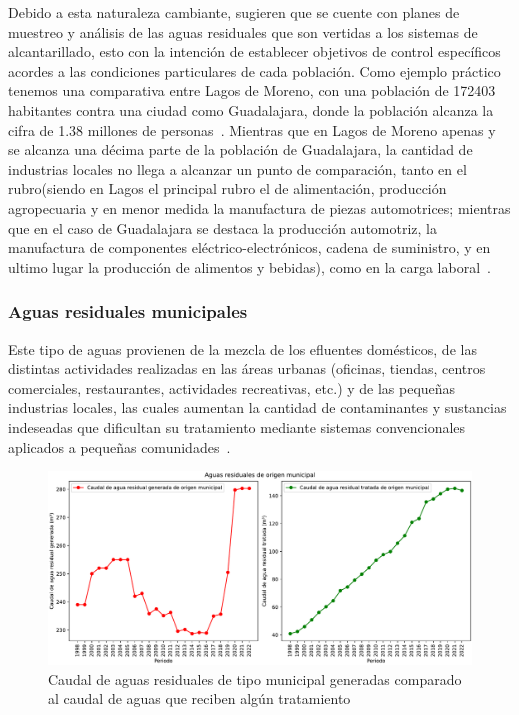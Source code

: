 Debido a esta naturaleza cambiante, \cite{Fair2008} sugieren que se cuente con planes de muestreo y análisis de las aguas residuales que son vertidas a los sistemas de alcantarillado, esto con la intención de establecer objetivos de control específicos acordes a las condiciones particulares de cada población. Como ejemplo práctico tenemos una comparativa entre Lagos de Moreno, con una población de 172403 habitantes contra una ciudad como Guadalajara, donde la población alcanza la cifra de 1.38 millones de personas~\citep{INEGIJAL}. Mientras que en Lagos de Moreno apenas y se alcanza una décima parte de la población de Guadalajara, la cantidad de industrias locales no llega a alcanzar un punto de comparación, tanto en el rubro(siendo en Lagos el principal rubro el de alimentación, producción agropecuaria y en menor medida la manufactura de piezas automotrices; mientras que en el caso de Guadalajara se destaca la producción automotriz, la manufactura de componentes eléctrico-electrónicos, cadena de suministro, y en ultimo lugar la producción de alimentos y bebidas), como en la carga laboral~\citep{Eunice2022,Lagosjal}.
\subsubsection*{Aguas residuales municipales}
Este tipo de aguas provienen de la mezcla de los \glspl{efluente} domésticos, de las distintas actividades realizadas en las áreas urbanas (oficinas, tiendas, centros comerciales, restaurantes, actividades recreativas, etc.) y de las pequeñas industrias locales, las cuales aumentan la cantidad de contaminantes y sustancias indeseadas que dificultan su tratamiento mediante sistemas convencionales aplicados a pequeñas comunidades~\citep{lazcano2016}.
\begin{figure}[htbp]
	\centering
	\includegraphics[scale=0.45]{../Images/AR_municipal_svg-tex.pdf}
	\caption{Caudal de aguas residuales de tipo municipal generadas comparado al caudal de aguas que reciben algún tratamiento}
\end{figure}
